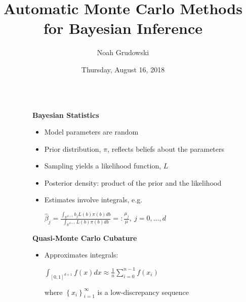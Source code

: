 \documentclass[final,mathserif]{beamer}
\title{Automatic Monte Carlo Methods for Bayesian Inference}
\author{Noah Grudowski}
\institute{Applied Mathematics, Illinois Institute of
Technology}
\date{Thursday, August 16, 2018}
\newcommand{\blue}[1]{{\color{myblue}#1}}
\renewcommand{\blue}{\textcolor{blue!80!black}}
\begin{document}
\vspace*{-1.5ex}
\begin{frame}[fragile]

\begin{columns}[t]

\begin{column}{.02\linewidth}\end{column} %

\begin{column}{.31\linewidth} %

\begin{block}{\Large \textbf{\blue {Bayesian Statistics}}}
\vspace{.1in}
\begin{itemize}
\item Model parameters are random
\item \alert{Prior} distribution, $\pi$, reflects beliefs about the parameters
\item Sampling yields a likelihood function, $L$
\item \alert{Posterior} density: product of the prior and the likelihood
\item Estimates involve integrals, e.g. 

\vspace{.1in}

$\hat{\beta}_j=\frac{\int_{\mathbb{R}^{d+1}}b_jL(b)\pi(b)db}{\int_{\mathbb{R}^{d+1}}L(b)\pi(b)db} =: \frac{\mu_j}{\mu},\  j=0, \ldots, d$

\vspace{.1in}

\end{itemize}
\end{block}

\vspace{.1in}

\begin{block} {\Large \textbf{\blue {Quasi-Monte Carlo Cubature}}}
\vspace{.1in}
\begin{itemize}
\item Approximates integrals:

\vspace{0.1in}

$\int_{[0, 1]^{d+1}}f(x)dx\approx \frac{1}{n} \sum_{i=0}^{n-1}f({x_i})$ 

\vspace{.1in}

where $\left\{x_i\right\}_{i=1}^\infty$ is a low-discrepancy sequence


\end{itemize}
\end{block}
\end{column}
\end{columns}
\end{frame}
\end{document}
